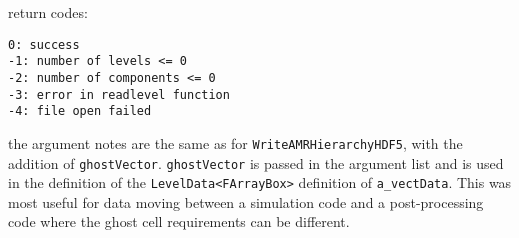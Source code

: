 return codes:

\begin{verbatim}
0: success
-1: number of levels <= 0
-2: number of components <= 0
-3: error in readlevel function
-4: file open failed
\end{verbatim}

the argument notes are the same as for \protect\verb|WriteAMRHierarchyHDF5|, with the
addition of \verb+ghostVector+.  \verb+ghostVector+ is passed in the argument list
and is used in the definition of the \verb+LevelData<FArrayBox>+ definition of \verb+a_vectData+.
This was most useful for data moving between a simulation code and a post-processing
code where the ghost cell requirements can be different.

